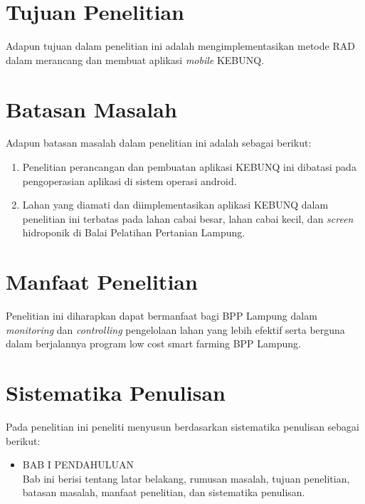 \begin{flushleft}
\begin{justify}
    \section{Tujuan Penelitian}
      Adapun tujuan dalam penelitian ini adalah mengimplementasikan metode RAD dalam merancang dan membuat aplikasi \textit{mobile} KEBUNQ.
      \\
    \section{Batasan Masalah}
      Adapun batasan masalah dalam penelitian ini adalah sebagai berikut:
      \begin{enumerate}
        \item Penelitian perancangan dan pembuatan aplikasi KEBUNQ ini dibatasi pada pengoperasian aplikasi di sistem operasi android.
        \item Lahan yang diamati dan diimplementasikan aplikasi KEBUNQ dalam penelitian ini terbatas pada lahan cabai besar, lahan cabai kecil, dan \emph{screen} hidroponik di Balai Pelatihan Pertanian Lampung.\\
      \end{enumerate} 
    \section{Manfaat Penelitian}
    Penelitian ini diharapkan dapat bermanfaat bagi BPP Lampung dalam \textit{monitoring} dan \textit{controlling} pengelolaan lahan yang lebih efektif serta berguna dalam berjalannya program low cost smart farming BPP Lampung.
    \\


    \section{Sistematika Penulisan}
    Pada penelitian ini peneliti menyusun berdasarkan sistematika penulisan sebagai berikut: 
      \begin{itemize}
        \item BAB I PENDAHULUAN
        \\
        Bab ini berisi tentang latar belakang, rumusan masalah, tujuan penelitian, 
        batasan masalah, manfaat penelitian, dan sistematika penulisan.


\end{itemize}
\end{justify}
\end{flushleft}
